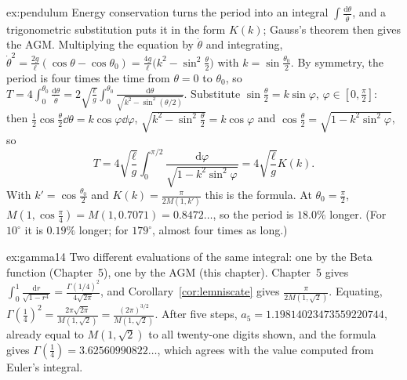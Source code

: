 \begin{solution}{ex:pendulum}
\idea Energy conservation turns the period into an integral $\int\frac{\mathrm d\theta}{\dot\theta}$, and a trigonometric substitution puts it in the form $K(k)$; Gauss's theorem
then gives the AGM.
\writeup Multiplying the equation by $\dot\theta$ and integrating, $\dot\theta^2=\frac{2g}\ell(\cos\theta-\cos\theta_0)=\frac{4g}\ell\bigl(k^2-\sin^2\frac\theta2\bigr)$ with $k=\sin\frac{\theta_0}2$.
By symmetry, the period is four times the time from $\theta=0$ to $\theta_0$, so $T=4\int_0^{\theta_0}\frac{\mathrm d\theta}{\dot\theta}=2\sqrt{\frac\ell g}\int_0^{\theta_0}\frac{\mathrm d\theta}{\sqrt{k^2-\sin^2(\theta/2)}}$.
Substitute $\sin\frac\theta2=k\sin\varphi$, $\varphi\in[0,\frac\pi2]$: then $\frac12\cos\frac\theta2\dd\theta=k\cos\varphi\dd\varphi$, $\sqrt{k^2-\sin^2\frac\theta2}=k\cos\varphi$ and
$\cos\frac\theta2=\sqrt{1-k^2\sin^2\varphi}$, so
\[
T=4\sqrt{\frac\ell g}\int_0^{\pi/2}\frac{\mathrm d\varphi}{\sqrt{1-k^2\sin^2\varphi}}=4\sqrt{\frac\ell g}K(k).
\]
With $k'=\cos\frac{\theta_0}2$ and $K(k)=\frac\pi{2M(1,k')}$ this is the formula. At $\theta_0=\frac\pi2$, $M(1,\cos\frac\pi4)=M(1,0.7071)=0.8472\ldots$, so the period is $18.0\%$ longer.
(For $10^\circ$ it is $0.19\%$ longer; for $179^\circ$, almost four times as long.)
\end{solution}

\begin{solution}{ex:gamma14}
\idea Two different evaluations of the same integral: one by the Beta function (Chapter~5), one by the AGM (this chapter).
\writeup Chapter~5 gives $\int_0^1\frac{\mathrm dr}{\sqrt{1-r^4}}=\frac{\Gamma(1/4)^2}{4\sqrt{2\pi}}$, and Corollary~\ref{cor:lemniscate} gives $\frac\pi{2M(1,\sqrt2)}$. Equating,
$\Gamma(\frac14)^2=\frac{2\pi\sqrt{2\pi}}{M(1,\sqrt2)}=\frac{(2\pi)^{3/2}}{M(1,\sqrt2)}$. After five steps, $a_5=1.19814023473559220744$, already equal to $M(1,\sqrt2)$ to all twenty-one digits shown, and the formula gives
$\Gamma(\frac14)=3.62560990822\ldots$, which agrees with the value computed from Euler's integral.
\end{solution}

